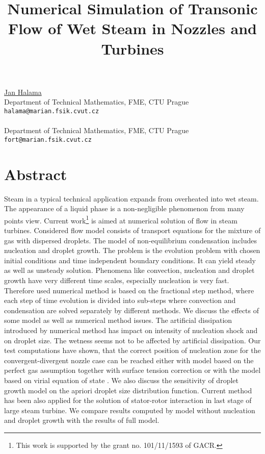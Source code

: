 \title{Numerical Simulation of Transonic Flow of Wet Steam in Nozzles and Turbines}
 \author{} \institute{}
\maketitle
\begin{center}
{\large \underline{Jan Halama}}\\
Department of Technical Mathematics, FME, CTU Prague\\
{\tt halama@marian.fsik.cvut.cz}
\\ \vspace{4mm}{\large Jaroslav Fo\v rt}\\
Department of Technical Mathematics, FME, CTU Prague\\
{\tt fort@marian.fsik.cvut.cz}

\end{center}

\section*{Abstract}

Steam in a typical technical application expands from overheated into wet steam. The appearance of a liquid phase is a non-negligible phenomenon from many points view. Current 
work\footnote{This work is supported by the grant no. 101/11/1593 of GACR.} is aimed at numerical solution of flow in steam turbines. Considered flow model consists of transport equations for the mixture of gas with dispersed droplets. The model of non-equilibrium condensation includes nucleation \cite{bd} and  droplet growth. The problem is the evolution problem with chosen initial conditions and time 
independent boundary conditions. It can yield steady as well as unsteady solution. Phenomena like convection, nucleation and droplet growth have very different time scales, especially nucleation is very fast. Therefore used numerical method is based on the fractional step method, where each step of time evolution
is divided into sub-steps where convection and condensation are solved separately by different
methods. We discuss the effects of some model as well as numerical method issues. The artificial dissipation introduced by numerical method has impact on intensity of nucleation shock and on droplet size. The wetness seems not to be affected by artificial dissipation. Our test computations have shown, that the correct position of nucleation zone for the convergent-divergent nozzle case can be reached either with model based on the perfect gas assumption together with surface tension correction \cite{kor} or with the model based on virial equation of state \cite{vir}. We also discuss the sensitivity of droplet growth model on the apriori droplet size distribution function. Current method has been also applied for the solution of stator-rotor interaction in last stage of large steam turbine. We compare results computed by model without nucleation
and droplet growth with the results of full model.


